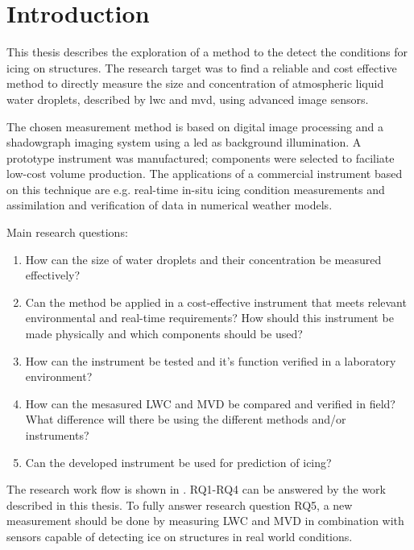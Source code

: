

\chapter{Introduction}
\label{chap:intro}
This thesis describes the exploration of a method to the detect the conditions for icing on structures. The research target was to find a reliable and cost effective method to directly measure the size and concentration of atmospheric liquid water droplets, described by \gls{lwc} and \gls{mvd}, using advanced image sensors.

The chosen measurement method is based on digital image processing and a shadowgraph imaging system using a \gls{led} as background illumination. A prototype instrument was manufactured; components were selected to faciliate low-cost volume production. The applications of a commercial instrument based on this technique are e.g. real-time in-situ icing condition measurements and assimilation and verification of data in numerical weather models. 

Main research questions:
\newcommand{\reqone}{How can the size of water droplets and their concentration be measured effectively?}
\newcommand{\reqtwo}{Can the method be applied in a cost-effective instrument that meets relevant environmental and real-time requirements? How should this instrument be made physically and which components should be used?}
\newcommand{\reqthree}{How can the instrument be tested and it's function verified in a laboratory environment?}
\newcommand{\reqfour}{How can the mesasured LWC and MVD be compared and verified in field? What difference will there be using the different methods and/or instruments?}
\newcommand{\reqfive}{Can the developed instrument be used for prediction of icing?}

\begin{enumerate}
\item[\namedlabel{itm:rq1}{RQ1}] \reqone
\item[\namedlabel{itm:rq2}{RQ2}] \reqtwo
\item[\namedlabel{itm:rq3}{RQ3}] \reqthree
\item[\namedlabel{itm:rq4}{RQ4}] \reqfour
\item[\namedlabel{itm:rq5}{RQ5}] \reqfive
\end{enumerate}

The research work flow is shown in . RQ1-RQ4 can be answered by the work described in this thesis. To fully answer research question RQ5, a new measurement should be done by measuring LWC and MVD in combination with sensors capable of detecting ice on structures in real world conditions.

